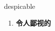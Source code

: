 
\begin{frame}
{\huge despicable}
\begin{center}
\begin{enumerate}\Large
  \item \textbf{令人鄙视的}
\end{enumerate}
\end{center}
\end{frame}
